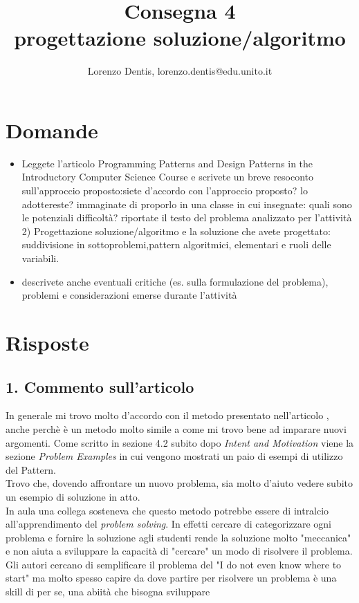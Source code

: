 \documentclass[a4paper]{article}
\begin{document}
\author{Lorenzo Dentis, lorenzo.dentis@edu.unito.it}
\title{Consegna 4 \\ \large progettazione soluzione/algoritmo}
\maketitle

\section{Domande}
\begin{itemize}
	\item Leggete l'articolo Programming Patterns and Design Patterns in the Introductory Computer Science Course e scrivete un breve resoconto sull'approccio proposto:siete d'accordo con l'approccio proposto? lo adottereste? immaginate di proporlo in una classe in cui insegnate: quali sono le potenziali difficoltà?
	\itemi riportate il testo del problema analizzato per l'attività 2) Progettazione soluzione/algoritmo e la soluzione che avete progettato: suddivisione in sottoproblemi,pattern algoritmici, elementari e ruoli delle variabili.
	\item descrivete anche eventuali critiche (es. sulla formulazione del problema), problemi e considerazioni emerse durante l'attività
\end{itemize}
\newline
\section{Risposte}
\subsection{1. Commento sull'articolo}
In generale mi trovo molto d'accordo con il metodo presentato nell'articolo \cite{articolo}, anche perchè è un metodo molto simile a come mi trovo bene ad imparare nuovi argomenti.
Come scritto in sezione 4.2 subito dopo \textit{Intent and Motivation} viene la sezione \textit{Problem Examples} in cui vengono mostrati un paio di esempi di utilizzo del Pattern.\\
Trovo che, dovendo affrontare un nuovo problema, sia molto d'aiuto vedere subito un esempio di soluzione in atto.\\
In aula una collega sosteneva che questo metodo potrebbe essere di intralcio all'apprendimento del \textit{problem solving}.
In effetti cercare di categorizzare ogni problema e fornire la soluzione agli studenti rende la soluzione molto "meccanica" e non aiuta a sviluppare la capacità di "cercare" un modo di risolvere il problema.
Gli autori cercano di semplificare il problema del "I do not even know where to start" ma molto spesso capire da dove partire per risolvere un problema è una skill di per se, una abiità che bisogna sviluppare 
\end{document}
